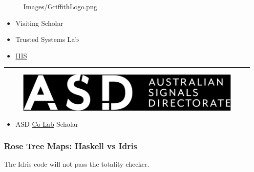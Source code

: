 \documentclass
  [hyperref={colorlinks = true,linkcolor = blue, 
             citecolor = blue, urlcolor = blue}
  ]{beamer}
\begin{document}
\begin{frame}[fragile]
\begin{minipage}{0.5\linewidth}
\begin{figure}[h]
        {Images/GriffithLogo.png}
    \end{figure}
  \end{minipage}
  \hfill
  \begin{minipage}{0.45\linewidth}
  \begin{itemize}
    \item Visiting Scholar
    \item Trusted Systems Lab
    \item \href{https://www.griffith.edu.au/institute-integrated-intelligent-systems}{IIIS}
  \end{itemize}
  \end{minipage}
\hrule
  \begin{minipage}{0.5\linewidth}
    \begin{figure}[h]
      \includegraphics[width=\linewidth]
        {Images/asd-logo.png}
    \end{figure}
  \end{minipage}
  \hfill
  \begin{minipage}{0.45\linewidth}
  \begin{itemize}
    \item ASD 
      \href{https://www.asd.gov.au/about/asd-anu-co-lab}{Co-Lab} 
      Scholar
  \end{itemize}
  \end{minipage}
\end{frame}

\begin{frame}[fragile]
  \frametitle{Rose Tree Maps: Haskell vs Idris}
  The Idris code will not pass the totality checker.
  \begin{minipage}{0.44\linewidth}
    \inputminted{haskell}{../Code/src/HaskellRose.hs}
  \end{minipage}
  $\;$
  \vline
  $\;$
  \begin{minipage}{0.5\linewidth}
    \inputminted{idris}{../Code/src/IdrisRoseBad.idr}
  \end{minipage}
\end{frame}
\end{document}
